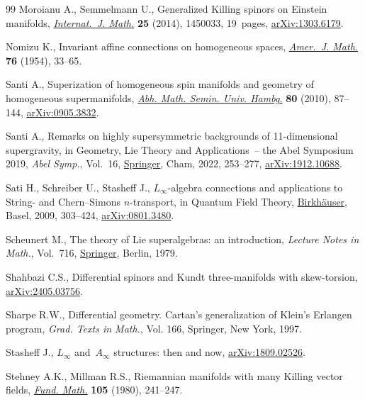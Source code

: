 \documentclass[10pt,a4paper]{amsart}
\numberwithin{equation}{section}
\newcommand{\1}{\mathbbm{1}}
\begin{document}
\begin{thebibliography}{99}
Moroianu A., Semmelmann U., Generalized {K}illing spinors on {E}instein
 manifolds,
 \href{https://doi.org/10.1142/S0129167X14500335}{\textit{Internat.~J. Math.}}
 \textbf{25} (2014), 1450033, 19~pages,
 \href{http://arxiv.org/abs/1303.6179}{arXiv:1303.6179}.

Nomizu K., Invariant affine connections on homogeneous spaces,
 \href{https://doi.org/10.2307/2372398}{\textit{Amer.~J. Math.}} \textbf{76}
 (1954), 33--65.

Santi A., Superization of homogeneous spin manifolds and geometry of
 homogeneous supermanifolds,
 \href{https://doi.org/10.1007/s12188-009-0031-2}{\textit{Abh. Math. Semin.
 Univ. Hambg.}} \textbf{80} (2010), 87--144,
 \href{http://arxiv.org/abs/0905.3832}{arXiv:0905.3832}.

Santi A., Remarks on highly supersymmetric backgrounds of 11-dimensional
 supergravity, in Geometry, {L}ie {T}heory and {A}pplications~-- the {A}bel
 {S}ymposium 2019, \textit{Abel Symp.}, Vol.~16,
 \href{https://doi.org/10.1007/978-3-030-81296-6_12}{Springer}, Cham, 2022,
 253--277, \href{http://arxiv.org/abs/1912.10688}{arXiv:1912.10688}.

Sati H., Schreiber U., Stasheff J., {$L_\infty$}-algebra connections and
 applications to {S}tring- and {C}hern--{S}imons {$n$}-transport, in Quantum
 {F}ield {T}heory,
 \href{https://doi.org/10.1007/978-3-7643-8736-5_17}{Birkh\"auser}, Basel,
 2009, 303--424, \href{http://arxiv.org/abs/0801.3480}{arXiv:0801.3480}.

Scheunert M., The theory of {L}ie superalgebras: an introduction,
 \textit{Lecture Notes in Math.}, Vol.~716,
 \href{https://doi.org/10.1007/BFb0070929}{Springer}, Berlin, 1979.

Shahbazi C.S., Differential spinors and {K}undt three-manifolds with
 skew-torsion, \href{http://arxiv.org/abs/2405.03756}{arXiv:2405.03756}.

Sharpe R.W., Differential geometry. Cartan's generalization of {K}lein's
 {E}rlangen program, \textit{Grad. Texts in Math.}, Vol. 166, Springer, New
 York, 1997.

Stasheff J., $L_\infty$ and~$A_\infty$ structures: then and now,
 \href{http://arxiv.org/abs/1809.02526}{arXiv:1809.02526}.

Stehney A.K., Millman R.S., Riemannian manifolds with many {K}illing vector
 fields, \href{https://doi.org/10.4064/fm-105-3-241-247}{\textit{Fund. Math.}}
 \textbf{105} (1980), 241--247.


\end{thebibliography}
\end{document}
